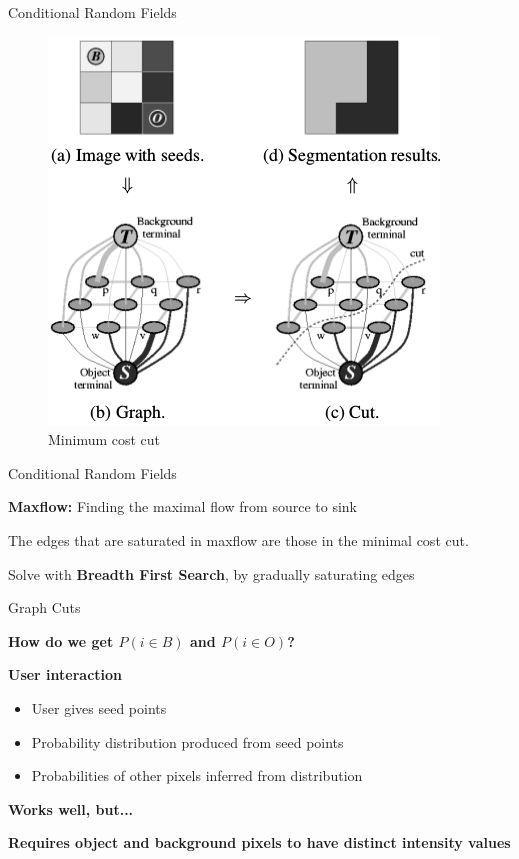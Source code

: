 \documentclass[10pt]{beamer}
\begin{document}
\begin{frame}[fragile]{Conditional Random Fields}
  
  \begin{figure}[h!]
    \centering
    \includegraphics[scale=0.49]{pictures/graphCuts2}
    \caption{Minimum cost cut}
    \label{fig:minCut}
  \end{figure}

  
\end{frame}


\begin{frame}[fragile]{Conditional Random Fields}

  \textbf{Maxflow:} Finding the maximal flow from source to sink

  The edges that are saturated in maxflow are those in the minimal cost cut.

  \pause
  Solve with \textbf{Breadth First Search}, by gradually saturating edges
  
\end{frame}


\begin{frame}[fragile]{Graph Cuts}

  \textbf{How do we get $P(i \in B)$ and $P(i \in O)$?}
  
  \textbf{User interaction}
  
  \begin{itemize}
  \item User gives seed points
  \item Probability distribution produced from seed points
  \item Probabilities of other pixels inferred from distribution
  \end{itemize}
  
  \textbf{Works well, but...}

  \pause
  \textbf{Requires object and background pixels to have distinct intensity values}
  
\end{frame}
\end{document}
